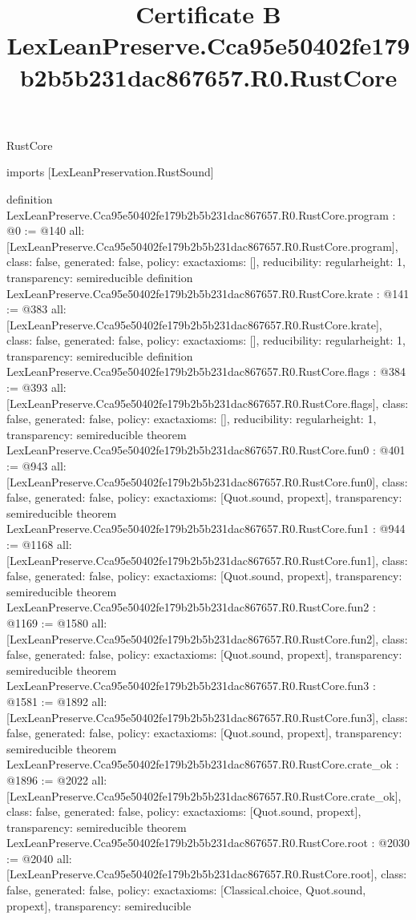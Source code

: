 \begin{lexlean}{RustCore}
\title{Certificate B LexLeanPreserve.Cca95e50402fe179b2b5b231dac867657.R0.RustCore}
\begin{coremodule}
imports [LexLeanPreservation.RustSound]

definition LexLeanPreserve.Cca95e50402fe179b2b5b231dac867657.R0.RustCore.program : @0 := @140 {
  all: [LexLeanPreserve.Cca95e50402fe179b2b5b231dac867657.R0.RustCore.program],
  class: false,
  generated: false,
  policy: exact{axioms: []},
  reducibility: regular{height: 1},
  transparency: semireducible
}
definition LexLeanPreserve.Cca95e50402fe179b2b5b231dac867657.R0.RustCore.krate : @141 := @383 {
  all: [LexLeanPreserve.Cca95e50402fe179b2b5b231dac867657.R0.RustCore.krate],
  class: false,
  generated: false,
  policy: exact{axioms: []},
  reducibility: regular{height: 1},
  transparency: semireducible
}
definition LexLeanPreserve.Cca95e50402fe179b2b5b231dac867657.R0.RustCore.flags : @384 := @393 {
  all: [LexLeanPreserve.Cca95e50402fe179b2b5b231dac867657.R0.RustCore.flags],
  class: false,
  generated: false,
  policy: exact{axioms: []},
  reducibility: regular{height: 1},
  transparency: semireducible
}
theorem LexLeanPreserve.Cca95e50402fe179b2b5b231dac867657.R0.RustCore.fun0 : @401 := @943 {
  all: [LexLeanPreserve.Cca95e50402fe179b2b5b231dac867657.R0.RustCore.fun0],
  class: false,
  generated: false,
  policy: exact{axioms: [Quot.sound, propext]},
  transparency: semireducible
}
theorem LexLeanPreserve.Cca95e50402fe179b2b5b231dac867657.R0.RustCore.fun1 : @944 := @1168 {
  all: [LexLeanPreserve.Cca95e50402fe179b2b5b231dac867657.R0.RustCore.fun1],
  class: false,
  generated: false,
  policy: exact{axioms: [Quot.sound, propext]},
  transparency: semireducible
}
theorem LexLeanPreserve.Cca95e50402fe179b2b5b231dac867657.R0.RustCore.fun2 : @1169 := @1580 {
  all: [LexLeanPreserve.Cca95e50402fe179b2b5b231dac867657.R0.RustCore.fun2],
  class: false,
  generated: false,
  policy: exact{axioms: [Quot.sound, propext]},
  transparency: semireducible
}
theorem LexLeanPreserve.Cca95e50402fe179b2b5b231dac867657.R0.RustCore.fun3 : @1581 := @1892 {
  all: [LexLeanPreserve.Cca95e50402fe179b2b5b231dac867657.R0.RustCore.fun3],
  class: false,
  generated: false,
  policy: exact{axioms: [Quot.sound, propext]},
  transparency: semireducible
}
theorem LexLeanPreserve.Cca95e50402fe179b2b5b231dac867657.R0.RustCore.crate_ok : @1896 := @2022 {
  all: [LexLeanPreserve.Cca95e50402fe179b2b5b231dac867657.R0.RustCore.crate_ok],
  class: false,
  generated: false,
  policy: exact{axioms: [Quot.sound, propext]},
  transparency: semireducible
}
theorem LexLeanPreserve.Cca95e50402fe179b2b5b231dac867657.R0.RustCore.root : @2030 := @2040 {
  all: [LexLeanPreserve.Cca95e50402fe179b2b5b231dac867657.R0.RustCore.root],
  class: false,
  generated: false,
  policy: exact{axioms: [Classical.choice, Quot.sound, propext]},
  transparency: semireducible
}


\end{coremodule}
\end{lexlean}
